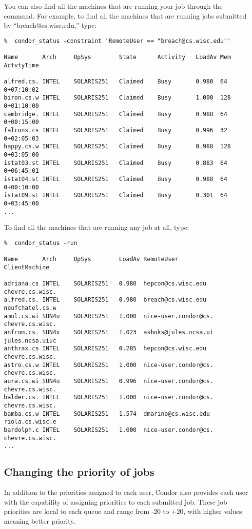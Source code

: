 You can also find all the machines that are running your job through the
 command.  For example, to find all the machines that are
running jobs submitted by ``breach@cs.wisc.edu,'' type:
\begin{verbatim}
%  condor_status -constraint 'RemoteUser == "breach@cs.wisc.edu"'

Name       Arch     OpSys        State      Activity   LoadAv Mem  ActvtyTime

alfred.cs. INTEL    SOLARIS251   Claimed    Busy       0.980  64    0+07:10:02
biron.cs.w INTEL    SOLARIS251   Claimed    Busy       1.000  128   0+01:10:00
cambridge. INTEL    SOLARIS251   Claimed    Busy       0.988  64    0+00:15:00
falcons.cs INTEL    SOLARIS251   Claimed    Busy       0.996  32    0+02:05:03
happy.cs.w INTEL    SOLARIS251   Claimed    Busy       0.988  128   0+03:05:00
istat03.st INTEL    SOLARIS251   Claimed    Busy       0.883  64    0+06:45:01
istat04.st INTEL    SOLARIS251   Claimed    Busy       0.988  64    0+00:10:00
istat09.st INTEL    SOLARIS251   Claimed    Busy       0.301  64    0+03:45:00
...
\end{verbatim}
To find all the machines that are running any job at all, type:
\begin{verbatim}
%  condor_status -run

Name       Arch     OpSys        LoadAv RemoteUser           ClientMachine  

adriana.cs INTEL    SOLARIS251   0.980  hepcon@cs.wisc.edu   chevre.cs.wisc.
alfred.cs. INTEL    SOLARIS251   0.980  breach@cs.wisc.edu   neufchatel.cs.w
amul.cs.wi SUN4u    SOLARIS251   1.000  nice-user.condor@cs. chevre.cs.wisc.
anfrom.cs. SUN4x    SOLARIS251   1.023  ashoks@jules.ncsa.ui jules.ncsa.uiuc
anthrax.cs INTEL    SOLARIS251   0.285  hepcon@cs.wisc.edu   chevre.cs.wisc.
astro.cs.w INTEL    SOLARIS251   1.000  nice-user.condor@cs. chevre.cs.wisc.
aura.cs.wi SUN4u    SOLARIS251   0.996  nice-user.condor@cs. chevre.cs.wisc.
balder.cs. INTEL    SOLARIS251   1.000  nice-user.condor@cs. chevre.cs.wisc.
bamba.cs.w INTEL    SOLARIS251   1.574  dmarino@cs.wisc.edu  riola.cs.wisc.e
bardolph.c INTEL    SOLARIS251   1.000  nice-user.condor@cs. chevre.cs.wisc.
...
\end{verbatim}

\subsection{Changing the priority of jobs}
\label{sec:job-prio}
In addition to the priorities assigned to each user, Condor also provides
each user with the capability of assigning priorities to each submitted job.
These job priorities are local to each queue and range from -20 to +20, with
higher values meaning better priority.

